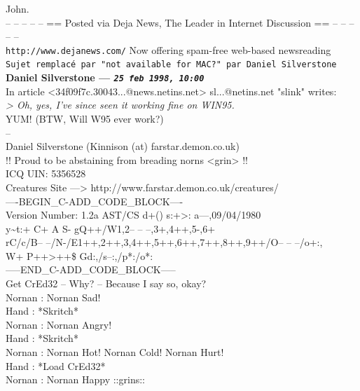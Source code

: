 \documentclass[11pt,twoside,a4paper]{article}
\begin{document}
\begin{multicols*}{2}
John.~\\

-- -- -- -- -- == Posted via Deja News, The Leader in Internet Discussion == -- -- -- -- --~\\ 
\texttt{http://www.dejanews.com/}   Now offering spam-free web-based newsreading~\\

 
		
	
		
\texttt{Sujet remplac{\'e} par "not available for MAC?" par Daniel Silverstone}~\\
		
	
		
\textbf{Daniel Silverstone --- \emph{\texttt{25 feb 1998, 10:00}}}~\\

In article <34f09f7c.30043...@news.netins.net> sl...@netins.net "slink" writes:~\\
\emph{> Oh, yes, I've since seen it working fine on WIN95.}~\\

YUM! (BTW, Will W95 ever work?)~\\

-- ~\\
Daniel Silverstone (Kinnison (at) farstar.demon.co.uk)~\\
        !! Proud to be abstaining from breading norns <grin> !!~\\
 ICQ UIN: 5356528~\\
Creatures Site ---> http://www.farstar.demon.co.uk/creatures/~\\

----BEGIN\_C-ADD\_CODE\_BLOCK----~\\
Version Number: 1.2a AST/CS d+() s:+>: a---,09/04/1980~\\
y\textasciitilde  t:+ C+ A S- gQ++/W1,2-- -- --,3+,4++,5-,6+~\\
rC/c/B-- --/N-/E1++,2++,3,4++,5++,6++,7++,8++,9++/O-- -- --/o+:,~\\
W+ P++>++\$ Gd:,/s--:,/p*:/o*:~\\
-----END\_C-ADD\_CODE\_BLOCK-----~\\

Get CrEd32 -- Why? -- Because I say so, okay?~\\

Nornan : Nornan Sad!~\\
Hand   : *Skritch*~\\
Nornan : Nornan Angry!~\\
Hand   : *Skritch*~\\
Nornan : Nornan Hot! Nornan Cold! Nornan Hurt!~\\
Hand   : *Load CrEd32*~\\
Nornan : Nornan Happy ::grins::~\\


\end{multicols*}
\end{document}
